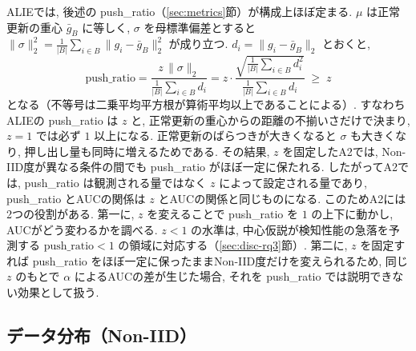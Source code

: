 \documentclass[a4j, twocolumn, dvipdfmx]{jsarticle}
\newcommand{\PushRatio}{\textrm{push\_ratio}}
\begin{document}
ALIEでは, 後述の \PushRatio{}（\ref{sec:metrics}節）が構成上ほぼ定まる. $\mu$ は正常更新の重心 $\bar{g}_B$ に等しく, $\sigma$ を母標準偏差とすると $\|\sigma\|_2^2 = \frac{1}{|B|}\sum_{i \in B}\|g_i - \bar{g}_B\|_2^2$ が成り立つ. $d_i = \|g_i - \bar{g}_B\|_2$ とおくと,
\begin{equation}
\PushRatio
= \frac{z\,\|\sigma\|_2}{\frac{1}{|B|}\sum_{i \in B} d_i}
= z \cdot \frac{\sqrt{\frac{1}{|B|}\sum_{i \in B} d_i^2}}{\frac{1}{|B|}\sum_{i \in B} d_i}
\;\ge\; z
\label{eq:alie-pushratio}
\end{equation}
となる（不等号は二乗平均平方根が算術平均以上であることによる）. すなわちALIEの \PushRatio{} は $z$ と, 正常更新の重心からの距離の不揃いさだけで決まり, $z=1$ では必ず $1$ 以上になる. 正常更新のばらつきが大きくなると $\sigma$ も大きくなり, 押し出し量も同時に増えるためである. その結果, $z$ を固定したA2では, Non-IID度が異なる条件の間でも \PushRatio{} がほぼ一定に保たれる. したがってA2では, \PushRatio{} は観測される量ではなく $z$ によって設定される量であり, \PushRatio{} とAUCの関係は $z$ とAUCの関係と同じものになる. このためA2には2つの役割がある. 第一に, $z$ を変えることで \PushRatio{} を $1$ の上下に動かし, AUCがどう変わるかを調べる. $z<1$ の水準は, 中心仮説が検知性能の急落を予測する $\PushRatio<1$ の領域に対応する（\ref{sec:disc-rq3}節）. 第二に, $z$ を固定すれば \PushRatio{} をほぼ一定に保ったままNon-IID度だけを変えられるため, 同じ $z$ のもとで $\alpha$ によるAUCの差が生じた場合, それを \PushRatio{} では説明できない効果として扱う.



\subsection{データ分布（Non-IID）}
\label{sec:data-noniid}
\end{document}

